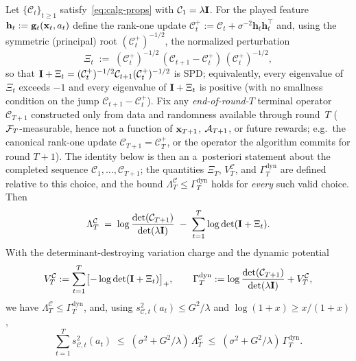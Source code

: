 \documentclass[twoside]{article}
\newcommand{\bh}{\mathbf{h}}                     %
\newcommand{\Calg}{\mathcal{C}}                 %
\newcommand{\Lamalg}{\Lambda^{\Calg}}           %
\newcommand{\Valg}{V^{\Calg}}                   %
\newcommand{\Gamdyn}{\Gamma^{\mathrm{dyn}}}     %
\begin{document}
\begin{lemma}\label{lem:dynamic-potential}
Let $\{\Calg_t\}_{t\ge1}$ satisfy~\eqref{eq:calg-props} with
$\Calg_1=\lambda\bI$.  For the played feature
$\bh_t:=\bg_t(\bx_t,a_t)$ define the rank-one update
$\Calg_t^{+}:=\Calg_t+\sigma^{-2}\bh_t\bh_t^\top$ and, using the symmetric
(principal) root $(\Calg_t^{+})^{-1/2}$, the normalized perturbation
\begin{equation}\label{eq:xi-def}
  \Xi_t \;:=\; (\Calg_t^{+})^{-1/2}\,(\Calg_{t+1}-\Calg_t^{+})\,
  (\Calg_t^{+})^{-1/2},
\end{equation}
so that $\bI+\Xi_t=(\Calg_t^{+})^{-1/2}\Calg_{t+1}(\Calg_t^{+})^{-1/2}$ is SPD;
equivalently, every eigenvalue of $\Xi_t$ exceeds $-1$ and every eigenvalue of
$\mathbf{I}+\Xi_t$ is positive (with no smallness condition on the jump
$\Calg_{t+1}-\Calg_t^{+}$).  Fix any \emph{end-of-round-$T$} terminal operator
$\Calg_{T+1}$ constructed only from data and randomness available through
round~$T$ ($\mathcal{F}_T$-measurable, hence not a function of $\mathbf{x}_{T+1}$, $\mathcal{A}_{T+1}$,
or future rewards; e.g.\ the canonical rank-one update $\Calg_{T+1}=\Calg_T^{+}$,
or the operator the algorithm commits for round $T{+}1$).  The identity below is
then an a~posteriori statement about the completed sequence
$\Calg_1,\dots,\Calg_{T+1}$; the quantities $\Xi_T$, $\Valg_T$, and $\Gamdyn_T$
are defined relative to this choice, and the bound $\Lamalg_T\le\Gamdyn_T$ holds
for \emph{every} such valid choice.  Then
\begin{equation}\label{eq:lam-identity}
  \Lamalg_T
  \;=\;
  \log\frac{\det(\Calg_{T+1})}{\det(\lambda\bI)}
  \;-\;
  \sum_{t=1}^T \log\det(\bI+\Xi_t).
\end{equation}
With the determinant-destroying variation charge and the dynamic potential
\begin{equation}\label{eq:vdyn-def}
  \Valg_T := \sum_{t=1}^T \bigl[-\log\det(\bI+\Xi_t)\bigr]_+,
  \qquad
  \Gamdyn_T := \log\frac{\det(\Calg_{T+1})}{\det(\lambda\bI)} + \Valg_T,
\end{equation}
we have $\Lamalg_T\le\Gamdyn_T$, and, using
$s_{\Calg,t}^2(a_t)\le G^2/\lambda$ and $\log(1+x)\ge x/(1+x)$,
\begin{equation}\label{eq:width-sum-dyn}
  \sum_{t=1}^T s_{\Calg,t}^2(a_t)
  \;\le\;
  (\sigma^2+G^2/\lambda)\,\Lamalg_T
  \;\le\;
  (\sigma^2+G^2/\lambda)\,\Gamdyn_T .
\end{equation}
\end{lemma}
\end{document}
